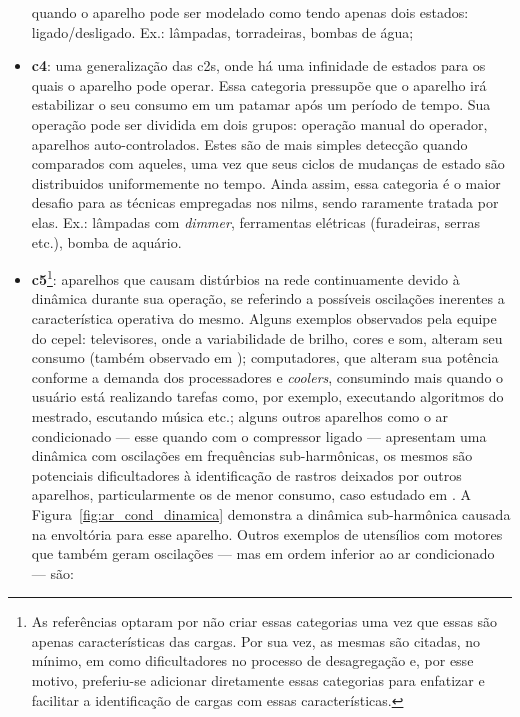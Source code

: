 \begin{itemize}
quando o aparelho pode ser modelado como tendo apenas dois estados:
ligado/desligado. Ex.: lâmpadas, torradeiras, bombas de água;
\item \textbf{\Gls{c4}}: uma generalização das \glspl{c2}, onde
há uma infinidade de estados para os quais o aparelho pode operar.
Essa categoria pressupõe que o aparelho irá estabilizar o seu consumo
em um patamar após um período de tempo. Sua operação pode ser dividida
em dois grupos: operação manual do operador, aparelhos
auto-controlados. Estes são de mais simples detecção quando comparados
com aqueles, uma vez que seus ciclos de mudanças de estado são
distribuidos uniformemente no tempo. Ainda assim, essa categoria é o
maior desafio para as técnicas empregadas nos \glspl{nilm}, sendo
raramente tratada por elas. Ex.: lâmpadas com \emph{dimmer},
ferramentas elétricas (furadeiras, serras etc.), bomba de aquário.
\item \textbf{\Gls{c5}}\footnote{As referências optaram por não
criar essas categorias uma vez que essas são apenas
características das cargas. Por sua vez, as mesmas são citadas, no
mínimo, em \cite{nilm_zeifman_review_2011,nilm_liang_pt2_2010_40}
como dificultadores no processo de desagregação e, por esse motivo,
preferiu-se adicionar diretamente essas categorias para
enfatizar e facilitar a identificação de cargas com essas
características.\label{fn:categoria_add}}: aparelhos que causam
distúrbios na rede continuamente devido à dinâmica durante sua
operação, se referindo a possíveis oscilações inerentes a
característica operativa do mesmo. Alguns exemplos observados pela
equipe do \gls{cepel}: televisores, onde a variabilidade de brilho,
cores e som, alteram seu consumo (também observado em
\cite{nilm_zeifman_statistical_naive_enduses_2013}); computadores, que
alteram sua potência conforme a demanda dos processadores e
\emph{coolers}, consumindo mais quando o usuário está realizando
tarefas como, por exemplo, executando algoritmos do mestrado,
escutando música etc.; alguns outros aparelhos como o ar condicionado
--- esse quando com o compressor ligado --- apresentam uma dinâmica
com oscilações em frequências sub-harmônicas, os mesmos são potenciais
dificultadores à identificação de rastros deixados por outros
aparelhos, particularmente os de menor consumo, caso estudado em
\cite{nilm_liang_pt2_2010_40}. A Figura~\ref{fig:ar_cond_dinamica}
demonstra a dinâmica sub-harmônica causada na envoltória para esse
aparelho. Outros exemplos de utensílios com motores que também geram
oscilações --- mas em ordem inferior ao ar condicionado --- são:

\end{itemize}
